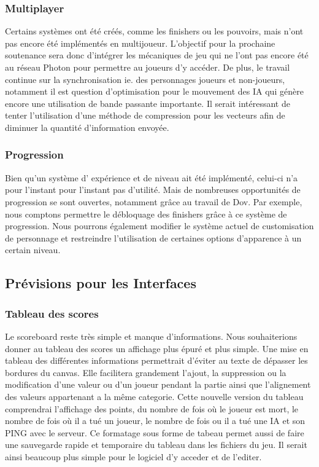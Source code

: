 	\subsubsection{Multiplayer}
	Certains systèmes ont été créés, comme les finishers ou les pouvoirs, mais n'ont pas encore été 
	implémentés en multijoueur. L'objectif pour la prochaine soutenance sera donc d'intégrer les mécaniques 
	de jeu qui ne l'ont pas encore été au réseau Photon pour permettre au joueurs d'y accéder. De plus, le 
	travail continue sur la synchronisation ie. des personnages joueurs et non-joueurs, notamment il est 
	question d'optimisation pour le mouvement des IA qui génère encore une utilisation de bande passante importante. 
	Il serait intéressant de tenter l'utilisation d'une méthode de compression pour les vecteurs afin de diminuer 
	la quantité d'information envoyée.

	\subsubsection{Progression}
		Bien qu'un système d' expérience et de niveau ait été implémenté, celui-ci n'a pour l'instant pour 
		l'instant pas d'utilité. Mais de nombreuses opportunités de progression se sont ouvertes, 
		notamment grâce au travail de Dov. Par exemple, nous comptons permettre le débloquage des 
		finishers grâce à ce système de progression. Nous pourrons également modifier le système actuel 
		de customisation de personnage et restreindre l'utilisation de certaines options d'apparence à un certain niveau.

\subsection{Prévisions pour les Interfaces}
    \subsubsection{Tableau des scores}
    Le scoreboard reste très simple et manque d’informations. Nous souhaiterions donner au tableau des scores un affichage plus épuré et plus simple. Une mise en tableau des différentes informations permettrait d’éviter au texte de dépasser les bordures du canvas. Elle facilitera grandement l’ajout, la suppression ou la modification d’une valeur ou d’un joueur pendant la partie ainsi que l’alignement des valeurs appartenant a la même categorie. 
    Cette nouvelle version du tableau comprendrai l'affichage des points, du nombre de fois où le joueur est mort, le nombre de fois où il a tué un joueur, le nombre de fois ou il a tué une IA et son PING avec le serveur.
    Ce formatage sous forme de tabeau permet aussi de faire une sauvegarde rapide et temporaire du tableau dans les fichiers du jeu. Il serait ainsi beaucoup plus simple pour le logiciel d'y acceder et de l'editer.
    
